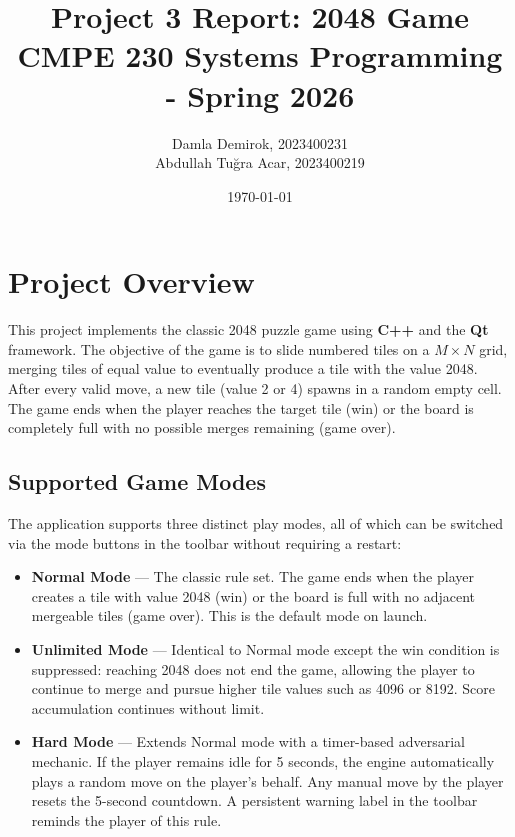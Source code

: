 \documentclass[a4paper,12pt]{article}
\title{Project 3 Report: 2048 Game\\
\large CMPE 230 Systems Programming - Spring 2026}
\author{
Damla Demirok, 2023400231 \\
Abdullah Tu\u{g}ra Acar, 2023400219
}
\date{\today}
\begin{document}
\maketitle
\tableofcontents
\newpage

\section{Project Overview}

This project implements the classic 2048 puzzle game using \textbf{C++} and the \textbf{Qt} framework. The objective of the game is to slide numbered tiles on a $M \times N$ grid, merging tiles of equal value to eventually produce a tile with the value 2048. After every valid move, a new tile (value 2 or 4) spawns in a random empty cell. The game ends when the player reaches the target tile (win) or the board is completely full with no possible merges remaining (game over).

\subsection{Supported Game Modes}

The application supports three distinct play modes, all of which can be switched via the mode buttons in the toolbar without requiring a restart:

\begin{itemize}
    \item \textbf{Normal Mode} --- The classic rule set. The game ends when the player creates a tile with value 2048 (win) or the board is full with no adjacent mergeable tiles (game over). This is the default mode on launch.

    \item \textbf{Unlimited Mode} --- Identical to Normal mode except the win condition is suppressed: reaching 2048 does not end the game, allowing the player to continue to merge and pursue higher tile values such as 4096 or 8192. Score accumulation continues without limit.

    \item \textbf{Hard Mode} --- Extends Normal mode with a timer-based adversarial mechanic. If the player remains idle for 5 seconds, the engine automatically plays a random move on the player's behalf. Any manual move by the player resets the 5-second countdown. A persistent warning label in the toolbar reminds the player of this rule.
\end{itemize}
\end{document}

